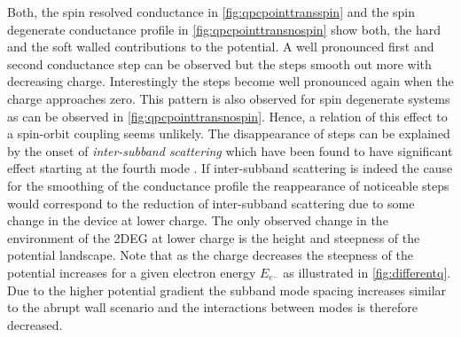 Both, the spin resolved conductance in \cref{fig:qpcpointtransspin} and the spin degenerate conductance profile in \cref{fig:qpcpointtransnospin} show both, the hard and the soft walled contributions to the potential. A well pronounced first and second conductance step can be observed but the steps smooth out more with decreasing charge. Interestingly the steps become well pronounced again when the charge approaches zero. This pattern is also observed for spin degenerate systems as can be observed in \cref{fig:qpcpointtransnospin}. Hence, a relation of this effect to a spin-orbit coupling seems unlikely. The disappearance of steps can be explained by the onset of \emph{inter-subband scattering} which have been found to have significant effect starting at the fourth mode \cite{Lehmann2011}. If inter-subband scattering is indeed the cause for the smoothing of the conductance profile the reappearance of noticeable steps would correspond to the reduction of inter-subband scattering due to some change in the device at lower charge. The only observed change in the environment of the 2DEG at lower charge is the height and steepness of the potential landscape.
Note that as the charge decreases the steepness of the potential increases for a given electron energy $E_{e^-}$ as illustrated in \cref{fig:differentq}. Due to the higher potential gradient the subband mode spacing increases similar to the abrupt wall scenario and the interactions between modes is therefore decreased.
